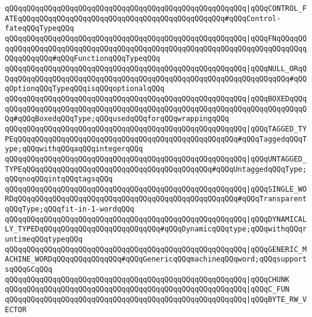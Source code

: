 \verb|qQQqqQQqqQQqqQQqqQQqqQQqqQQqqQQqqQQqqQQqqQQqqQQqqQQqqQQq|\verb#|qQQqCONTROL_FATEqQQqqQQqqQQqqQQqqQQqqQQqqQQqqQQqqQQqqQQqqQQqqQQq#\verb|#qQQqControl-fateqQQqTypeqQQq|\newline
\verb|qQQqqQQqqQQqqQQqqQQqqQQqqQQqqQQqqQQqqQQqqQQqqQQqqQQqqQQq|\verb#|qQQqFNqQQqqQQqqQQqqQQqqQQqqQQqqQQqqQQqqQQqqQQqqQQqqQQqqQQqqQQqqQQqqQQqqQQqqQQqqQQqqQQqqQQqqQQq#\verb|#qQQqFunctionqQQqTypeqQQq|\newline
\verb|qQQqqQQqqQQqqQQqqQQqqQQqqQQqqQQqqQQqqQQqqQQqqQQqqQQqqQQq|\verb#|qQQqNULL_ORqQQqqQQqqQQqqQQqqQQqqQQqqQQqqQQqqQQqqQQqqQQqqQQqqQQqqQQqqQQqqQQqqQQq#\verb|#qQQqOptionqQQqTypeqQQqisqQQqoptionalqQQq|\newline
\newline
\verb|qQQqqQQqqQQqqQQqqQQqqQQqqQQqqQQqqQQqqQQqqQQqqQQqqQQqqQQq|\verb#|qQQqBOXEDqQQqqQQqqQQqqQQqqQQqqQQqqQQqqQQqqQQqqQQqqQQqqQQqqQQqqQQqqQQqqQQqqQQqqQQqqQQq#\verb|#qQQqBoxedqQQqType;qQQqusedqQQqforqQQqwrappingqQQq|\newline
\verb|qQQqqQQqqQQqqQQqqQQqqQQqqQQqqQQqqQQqqQQqqQQqqQQqqQQqqQQq|\verb#|qQQqTAGGED_TYPEqQQqqQQqqQQqqQQqqQQqqQQqqQQqqQQqqQQqqQQqqQQqqQQqqQQq#\verb|#qQQqTaggedqQQqType;qQQqwithqQQqaqQQqintegerqQQq|\newline
\verb|qQQqqQQqqQQqqQQqqQQqqQQqqQQqqQQqqQQqqQQqqQQqqQQqqQQqqQQq|\verb#|qQQqUNTAGGED_TYPEqQQqqQQqqQQqqQQqqQQqqQQqqQQqqQQqqQQqqQQqqQQq#\verb|#qQQqUntaggedqQQqType;qQQqnoqQQqintqQQqtagsqQQq|\newline
\verb|qQQqqQQqqQQqqQQqqQQqqQQqqQQqqQQqqQQqqQQqqQQqqQQqqQQqqQQq|\verb#|qQQqSINGLE_WORDqQQqqQQqqQQqqQQqqQQqqQQqqQQqqQQqqQQqqQQqqQQqqQQqqQQq#\verb|#qQQqTransparentqQQqType;qQQqfit-in-1-wordqQQq|\newline
\newline
\verb|qQQqqQQqqQQqqQQqqQQqqQQqqQQqqQQqqQQqqQQqqQQqqQQqqQQqqQQq|\verb#|qQQqDYNAMICALLY_TYPEDqQQqqQQqqQQqqQQqqQQqqQQqqQQq#\verb|#qQQqDynamicqQQqtype;qQQqwithqQQqruntimeqQQqtypeqQQq|\newline
\verb|qQQqqQQqqQQqqQQqqQQqqQQqqQQqqQQqqQQqqQQqqQQqqQQqqQQqqQQq|\verb#|qQQqGENERIC_MACHINE_WORDqQQqqQQqqQQqqQQq#\verb|#qQQqGenericqQQqmachineqQQqword;qQQqsupportsqQQqGCqQQq|\newline
\verb|qQQqqQQqqQQqqQQqqQQqqQQqqQQqqQQqqQQqqQQqqQQqqQQqqQQqqQQq|\verb#|qQQqCHUNK#\newline
\verb|qQQqqQQqqQQqqQQqqQQqqQQqqQQqqQQqqQQqqQQqqQQqqQQqqQQqqQQq|\verb#|qQQqC_FUN#\newline
\verb|qQQqqQQqqQQqqQQqqQQqqQQqqQQqqQQqqQQqqQQqqQQqqQQqqQQqqQQq|\verb#|qQQqBYTE_RW_VECTOR#\newline
